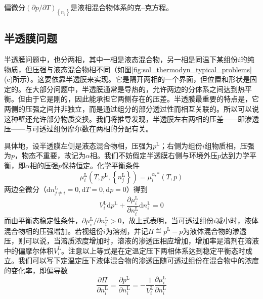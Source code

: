 \documentclass[main.tex]{subfiles}
\begin{document}
偏微分$\left(\partial p/\partial T\right)_{\left\{n_j\right\}}$是液相混合物体系的克--克方程。

\subsection{半透膜问题}
半透膜问题中，也分两相，其中一相是液态混合物，另一相是同温下某组份$i$的纯物质，但压强与液态混合物相不同（如图\ref{fig:sol_thermodyn_typical_problems}(c)所示）。这要依靠半透膜来实现。它是隔开两相的一个界面，但位置和形状是固定的。在大部分问题中，半透膜通常是导热的，允许两边的分体系之间达到热平衡。但由于它是刚的，因此能承担它两侧存在的压差。半透膜最重要的特点是，它两侧的压强之间并非独立，而是通过组分的部分透过性而相互关联的。所以可以说这种壁还允许部分物质交换。我们将推导发现，半透膜左右两相的压差——即渗透压——与可透过组份摩尔数在两相的分配有关。

具体地，设半透膜左侧是液态混合物相，压强为$p^\text{L}$；右侧为组份$i$组物质相，压强为$p$，物态不重要，故记为$\alpha$相。我们不妨假定半透膜右侧与环境外压$p$达到力学平衡，即$\alpha$相的压强$p$保持恒定。化学平衡条件
\[\mu_i^\text{L}\left(T,p^\text{L},\left\{n_j^\text{L}\right\}\right)=\mu_i^{\alpha,*}\left(T,p\right)\]
两边全微分（$\mathrm{d}n_{j\neq i}^\text{L}=0,\mathrm{d}T=0,\mathrm{d}p=0$）得到
\[V_i^\text{L}\mathrm{d}p^\text{L}+\frac{\partial \mu_i^\text{L}}{\partial n_i^\text{L}}\mathrm{d}n_i^\text{L}=0\]
而由平衡态稳定性条件，$\partial\mu_i^\text{L}/\partial n_i^\text{L}>0$，故上式表明，当可透过组份$i$减小时，液体混合物相的压强增加。若视组份$i$为溶剂，并记$\Pi\eqdef p^\text{L}-p$为液体混合物的渗透压，则可以说，当溶质浓度增加时，溶液的渗透压相应增加，增加率是溶剂在溶液中的偏摩尔体积$V_i^\text{L}$。注意以上等式是在定温定压下两相体系达到稳定平衡态时成立。我们可以写下定温定压下液体混合物的渗透压随可透过组份在混合物中的浓度的变化率，即偏导数
\[\frac{\partial\Pi}{\partial n_i^\text{L}}=\frac{\partial p^\text{L}}{\partial n_i^\text{L}}=-\frac{1}{V_i^\text{L}}\frac{\partial\mu_i^\text{L}}{\partial n_i^\text{L}}\]
\end{document}
